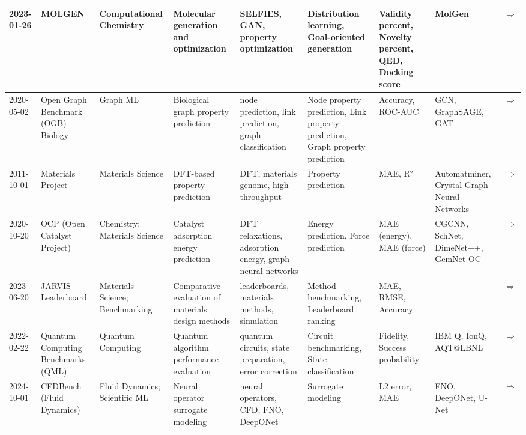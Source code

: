 \documentclass{article}
\begin{document}
\begin{landscape}
{\begin{longtable}{|p{1.5cm}|p{2.5cm}|p{2cm}|p{2cm}|p{2.5cm}|p{3cm}|p{2cm}|p{2cm}|p{1cm}|}
2023-01-26 & MOLGEN & Computational Chemistry & Molecular generation and optimization &  SELFIES, GAN, property optimization  &  Distribution learning, Goal-oriented generation  &  Validity percent, Novelty percent, QED, Docking score  &  MolGen  & \cite{fang2023domain} \href{https://arxiv.org/abs/2301.11259}{$\Rightarrow$ } \\ \hline
2020-05-02 & Open Graph Benchmark (OGB) - Biology & Graph ML & Biological graph property prediction &  node prediction, link prediction, graph classification  &  Node property prediction, Link property prediction, Graph property prediction  &  Accuracy, ROC-AUC  &  GCN, GraphSAGE, GAT  & \cite{hu2020ogb} \href{https://arxiv.org/abs/2005.00687}{$\Rightarrow$ } \\ \hline
2011-10-01 & Materials Project & Materials Science & DFT-based property prediction &  DFT, materials genome, high-throughput  &  Property prediction  &  MAE, R²  &  Automatminer, Crystal Graph Neural Networks  & \cite{jain2013materials} \href{https://materialsproject.org/}{$\Rightarrow$ } \\ \hline
2020-10-20 & OCP (Open Catalyst Project) & Chemistry; Materials Science & Catalyst adsorption energy prediction &  DFT relaxations, adsorption energy, graph neural networks  &  Energy prediction, Force prediction  &  MAE (energy), MAE (force)  &  CGCNN, SchNet, DimeNet++, GemNet-OC  & \cite{chanussot2021oc20, tran2023oc22, doi:10.1021/acscatal.0c04525, tran2023b} \href{https://pubs.acs.org/doi/10.1021/acscatal.0c04525}{$\Rightarrow$ } \\ \hline
2023-06-20 & JARVIS-Leaderboard & Materials Science; Benchmarking & Comparative evaluation of materials design methods &  leaderboards, materials methods, simulation  &  Method benchmarking, Leaderboard ranking  &  MAE, RMSE, Accuracy  &    & \cite{choudhary2024jarvis} \href{https://doi.org/10.1038/s41524-024-01259-w}{$\Rightarrow$ } \\ \hline
2022-02-22 & Quantum Computing Benchmarks (QML) & Quantum Computing & Quantum algorithm performance evaluation &  quantum circuits, state preparation, error correction  &  Circuit benchmarking, State classification  &  Fidelity, Success probability  &  IBM Q, IonQ, AQT@LBNL  & \cite{kiwit2023} \href{http://dx.doi.org/10.1109/QCE57702.2023.00061}{$\Rightarrow$ } \\ \hline
2024-10-01 & CFDBench (Fluid Dynamics) & Fluid Dynamics; Scientific ML & Neural operator surrogate modeling &  neural operators, CFD, FNO, DeepONet  &  Surrogate modeling  &  L2 error, MAE  &  FNO, DeepONet, U-Net  & \cite{luo2024cfdbenchlargescalebenchmarkmachine} \href{https://arxiv.org/abs/2310.05963}{$\Rightarrow$ } \\ \hline

\end{longtable}}
\end{landscape}
\end{document}
